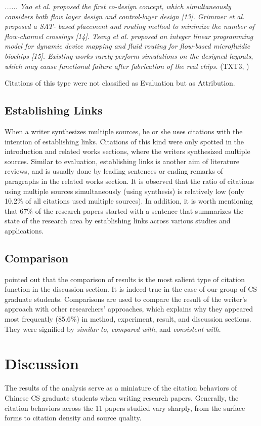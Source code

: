 \textit{...... Yao et al. proposed the first co-design concept, which simultaneously considers both flow layer design and control-layer design [13]. Grimmer et al. proposed a SAT- based placement and routing method to minimize the number of flow-channel crossings [14]. Tseng et al. proposed an integer linear programming model for dynamic device mapping and fluid routing for flow-based microfluidic biochips [15]. Existing works rarely perform simulations on the designed layouts, which may cause functional failure after fabrication of the real chips.} (TXT3, \citealp{ji_more_2018})

Citations of this type were not classified as Evaluation but as Attribution.

\subsection{Establishing Links}
When a writer synthesizes multiple sources, he or she uses citations with the intention of establishing links. Citations of this kind were only spotted in the introduction and related works sections, where the writers synthesized multiple sources. Similar to evaluation, establishing links is another aim of literature reviews, and is usually done by leading sentences or ending remarks of paragraphs in the related works section. It is observed that the ratio of citations using multiple sources simultaneously (using synthesis) is relatively low (only 10.2\% of all citations used multiple sources). In addition, it is worth mentioning that 67\% of the research papers started with a sentence that summarizes the state of the research area by establishing links across various studies and applications.

\subsection{Comparison}
\citet{samraj_form_2013} pointed out that the comparison of results is the most salient type of citation function in the discussion section. It is indeed true in the case of our group of CS graduate students. Comparisons are used to compare the result of the writer’s approach with other researchers’ approaches, which explains why they appeared most frequently (85.6\%) in method, experiment, result, and discussion sections. They were signified by \textit{similar to, compared with}, and \textit{consistent with}.

\section{Discussion}
The results of the analysis serve as a miniature of the citation behaviors of Chinese CS graduate students when writing research papers. Generally, the citation behaviors across the 11 papers studied vary sharply, from the surface forms to citation density and source quality.

